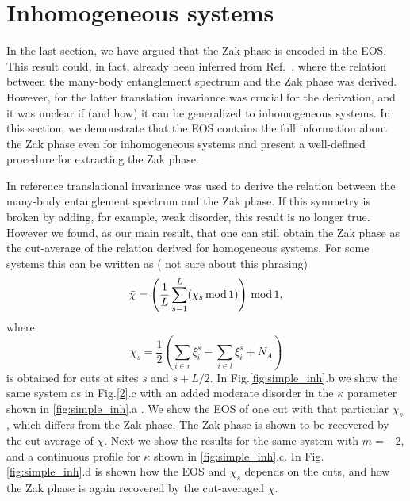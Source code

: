 \documentclass[twocolumn,amsmath,longbibliography,amssymb,superscriptaddress]{revtex4-1}
\newcommand{\carlos}[1]{{\color{red} #1}}
\begin{document}

\section{Inhomogeneous systems}

In the last section, we have argued that the Zak phase is encoded in the EOS. 
This result could, in fact, already been inferred from Ref.~\cite{Zaletel2014}, where the relation between the many-body entanglement spectrum and the Zak phase was derived. 
However, for the latter  translation invariance was crucial for the derivation, and it was unclear if (and how) it can be generalized to inhomogeneous systems.
In this section, we demonstrate that the EOS contains the full information about the Zak phase even for inhomogeneous systems and present a well-defined procedure for extracting the Zak phase. 

In reference \cite{Zaletel2014} translational invariance was used to derive the relation between the many-body entanglement spectrum and the Zak phase. If this symmetry is broken by adding, for example, weak disorder, this result is no longer true. However we found, as our main result, that one can still obtain the Zak phase as the cut-average of the relation derived for homogeneous systems. For some systems this can be written as (\carlos{not sure about this phrasing})
\begin{align}
\bar{\chi} =\left(\frac{1}{L}\sum_{s=1}^L (\chi_s \, \rm{mod} \, 1)\right)\, \rm{mod} \, 1,
\label{eq:inh_simple}
\end{align}
where
\begin{equation}
\chi_s = \frac{1}{2} \left( \sum_{i\in r}\xi^s_i-\sum_{i\in l}\xi^s_i  + N_A \right)
\end{equation}
is obtained for cuts at sites $s$ and $s+L/2$. In Fig.\ref{fig:simple_inh}.b we show the same system as in Fig.\ref{2}.c with an added moderate disorder in the $\kappa$ parameter shown in \ref{fig:simple_inh}.a . We show the EOS of one cut with that particular $\chi_s$, which differs from the Zak phase. The Zak phase is shown to be recovered by the cut-average of $\chi$. Next we show the results for the same system with $m=-2$, and a continuous profile for $\kappa$ shown in \ref{fig:simple_inh}.c. In Fig. \ref{fig:simple_inh}.d is shown how the EOS and $\chi_s$ depends on the cuts, and how the Zak phase is again recovered by the cut-averaged $\chi$.
\end{document}
